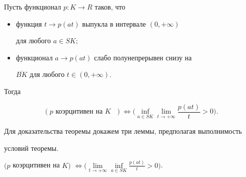 \begin {thmnonum}


Пусть функционал $p: K \to R$ таков, что


\begin{itemize}


\item[1)] функция $t \to p(at)$ выпукла в интервале $(0,+\infty)$ 


для любого $a \in SK;$


\item[2)] функционал $a \to p(at)$ слабо полунепрерывен снизу на


$\overline {BK}$ для любого $t\in(0,+\infty)$.


\end{itemize}


Тогда


$$


(p\text{ коэрцитивен на $K$ }) \Longleftrightarrow


\bigg(\inf_{a \in SK}


\lim_{t \to +\infty} \frac {p(at)}{t} > 0 \bigg).


$$


\end{thmnonum}





Для доказательства теоремы докажем три леммы, предполагая выполнимость 


условий теоремы.





\begin {lem}


$(p$ коэрцитивен на $K)$ $\Longleftrightarrow


\big(\lim\limits_{t \to +\infty }\inf\limits_{a \in SK}


\frac {p(at)}{t} > 0 \big)$. 


\end {lem}





